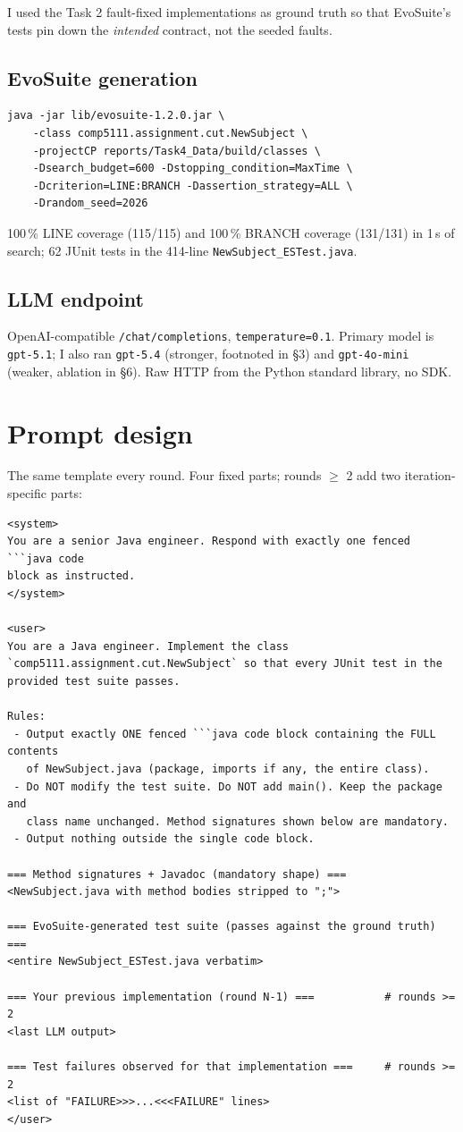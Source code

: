 \documentclass[manuscript,review,nonacm]{acmart}
\begin{document}
I used the Task 2 fault-fixed implementations as ground truth so that
EvoSuite's tests pin down the \emph{intended} contract, not the seeded
faults.

\subsection{EvoSuite generation}

\begin{lstlisting}
java -jar lib/evosuite-1.2.0.jar \
    -class comp5111.assignment.cut.NewSubject \
    -projectCP reports/Task4_Data/build/classes \
    -Dsearch_budget=600 -Dstopping_condition=MaxTime \
    -Dcriterion=LINE:BRANCH -Dassertion_strategy=ALL \
    -Drandom_seed=2026
\end{lstlisting}

100\,\% LINE coverage (115/115) and 100\,\% BRANCH coverage (131/131)
in 1\,s of search; 62 JUnit tests in the 414-line
\texttt{NewSubject\_ESTest.java}.

\subsection{LLM endpoint}
OpenAI-compatible \texttt{/chat/completions},
\texttt{temperature=0.1}. Primary model is \texttt{gpt-5.1}; I also
ran \texttt{gpt-5.4} (stronger, footnoted in \S3) and
\texttt{gpt-4o-mini} (weaker, ablation in \S6). Raw HTTP from the
Python standard library, no SDK.

\section{Prompt design}

The same template every round. Four fixed parts; rounds $\ge$ 2 add
two iteration-specific parts:

\begin{lstlisting}
<system>
You are a senior Java engineer. Respond with exactly one fenced ```java code
block as instructed.
</system>

<user>
You are a Java engineer. Implement the class
`comp5111.assignment.cut.NewSubject` so that every JUnit test in the
provided test suite passes.

Rules:
 - Output exactly ONE fenced ```java code block containing the FULL contents
   of NewSubject.java (package, imports if any, the entire class).
 - Do NOT modify the test suite. Do NOT add main(). Keep the package and
   class name unchanged. Method signatures shown below are mandatory.
 - Output nothing outside the single code block.

=== Method signatures + Javadoc (mandatory shape) ===
<NewSubject.java with method bodies stripped to ";">

=== EvoSuite-generated test suite (passes against the ground truth) ===
<entire NewSubject_ESTest.java verbatim>

=== Your previous implementation (round N-1) ===           # rounds >= 2
<last LLM output>

=== Test failures observed for that implementation ===     # rounds >= 2
<list of "FAILURE>>>...<<<FAILURE" lines>
</user>
\end{lstlisting}
\end{document}
